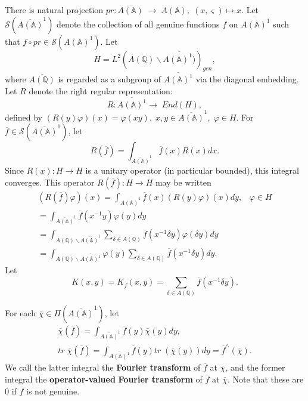 There is natural projection
$pr:\overline{A({\mathbb{A}})}\;\rightarrow \;A({\mathbb{A}}),
\;(x,\varsigma )\longmapsto x$. Let
${\mathcal{S}}(\overline{A({\mathbb{A}})}^1)$
denote the collection of all genuine functions $f$ on
$\overline{A({\mathbb{A}})^1}$ such
that $f\circ pr\in {\mathcal{S}}(A({\mathbb{A}})^1)$. Let 
\[
H=
L^2(\overline{A({\mathbb{Q}})}\backslash \overline{A({\mathbb{A}})^1)})_{gen},
\]
where \emph{$\overline{A({\mathbb{Q}})}$} is regarded as a subgroup
of $\overline{A({\mathbb{A}})^1}$ via the
diagonal embedding. Let $R$ denote
the right regular representation: 
\[
R:\overline{A({\mathbb{A}})^1}\rightarrow \;End(H),
\]
defined by $(R(y)\varphi )(x)
=\varphi (xy),\;x,y\in \overline{A({\mathbb{A}})}^1,
\;\varphi \in H$.
For $\overline{f}\in {\mathcal{S}}(\overline{A({\mathbb{A}})}^1)$, let 
\[
R(\overline{f})=\int_{\overline{A({\mathbb{A}})}^1}\overline{f}(x)R(x)dx.
\]
Since $R(x):H\rightarrow H$ is a unitary operator (in particular bounded),
this integral converges. This
operator $R(\overline{f}):H\rightarrow H$ may be written 
\begin{equation}\label{eq:3.11}
\begin{array}{c}
(R(\overline{f})\varphi )(x)
=\int_{\overline{A({\mathbb{A}})}^1}\overline{f}(x)(R(y)\varphi )(x)dy,
\;\;\;\varphi \in H \\ 
=\int_{\overline{A({\mathbb{A}})}^1}\overline{f}(x^{-1}y)\varphi (y)dy \\ 
=\int_{A({\mathbb{Q}})\backslash \overline{A({\mathbb{A}})}^1}
\sum_{\delta \in A({\mathbb{Q}})}
\overline{f}(x^{-1}\delta y)\varphi (\delta y)dy \\ 
=\int_{A({\mathbb{Q}})\backslash \overline{A({\mathbb{A}})^1}}
\varphi (y)
\sum_{\delta \in A({\mathbb{Q}})}\overline{f}(x^{-1}\delta y)dy.
\end{array}
\end{equation}
Let 
\[
K(x,y)=K_{\overline{f}}(x,y)
=\sum_{\delta \in A({\mathbb{Q}})}
\overline{f}(x^{-1}\delta y).
\]

For each $\overline{\chi }\in \Pi (\overline{A({\mathbb{A}})}^1)$, let 
\begin{equation}\label{eq:3.12}
\begin{array}{c}
\overline{\chi }(\overline{f})
=\int_{\overline{A({\mathbb{A}})}^1}
\overline{f}(y)\overline{\chi }(y)dy, \\ 
tr\;\overline{\chi }(\overline{f})
=\int_{\overline{A({\mathbb{A}})^1}}\overline{f}(y)
tr\;(\overline{\chi }(y))dy
=\overline{f}^{\wedge }(\overline{\chi }).
\end{array}
\end{equation}
We call the latter integral the \textbf{Fourier transform}
of $\overline{f}$ at $\overline{\chi }$, and the
former integral the \textbf{operator-valued}
\textbf{Fourier transform} of $\overline{f}$ at
$\overline{\chi }$. Note that these are
$0$ if $\overline{f}$ is not genuine.

